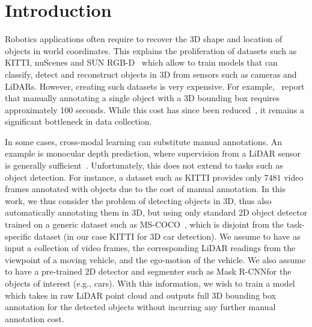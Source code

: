 \section{Introduction}\label{s:introduction}

Robotics applications often require to recover the 3D shape and location of objects in world coordinates.
This explains the proliferation of datasets such as KITTI, nuScenes and SUN RGB-D~\cite{geiger12are-we-ready,nuscenes2019,sun2020scalability} which allow to train models that can classify, detect and reconstruct objects in 3D from sensors such as cameras and LiDARs.
However, creating such datasets is very expensive.
For example,~\cite{sun-rgbd,wang2019apolloscape} report that manually annotating a single object with a 3D bounding box requires approximately 100 seconds.
While this cost has since been reduced~\cite{meng2020ws3d}, it remains a significant bottleneck in data collection.

In some cases, cross-modal learning can substitute manual annotations.
An example is monocular depth prediction, where supervision from a LiDAR sensor is generally sufficient~\cite{Fu_2018_CVPR}.
Unfortunately, this does not extend to tasks such as object detection.
For instance, a dataset such as KITTI provides only $7481$ video frames annotated with objects due to the cost of manual annotation.
In this work, we thus consider the problem of detecting objects in 3D, thus also automatically annotating them in 3D, but using only standard 2D object detector trained on a generic dataset such as MS-COCO~\cite{lin2014microsoft}, which is disjoint from the task-specific dataset (in our case KITTI for 3D car detection).
We assume to have as input a collection of video frames, the corresponding LiDAR readings from the viewpoint of a moving vehicle, and the ego-motion of the vehicle.
We also assume to have a pre-trained 2D detector and segmenter such as Mask R-CNN\@ for the objects of interest (e.g., cars).
With this information, we wish to train a model which takes in raw LiDAR point cloud and outputs full 3D bounding box annotation for the detected objects without incurring any further manual annotation cost.

